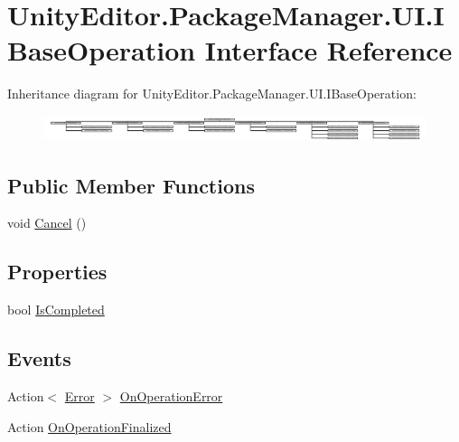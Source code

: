 \hypertarget{interface_unity_editor_1_1_package_manager_1_1_u_i_1_1_i_base_operation}{}\section{Unity\+Editor.\+Package\+Manager.\+U\+I.\+I\+Base\+Operation Interface Reference}
\label{interface_unity_editor_1_1_package_manager_1_1_u_i_1_1_i_base_operation}
Inheritance diagram for Unity\+Editor.\+Package\+Manager.\+U\+I.\+I\+Base\+Operation\+:\begin{figure}[H]
\begin{center}
\leavevmode
\includegraphics[height=0.758808cm]{interface_unity_editor_1_1_package_manager_1_1_u_i_1_1_i_base_operation}
\end{center}
\end{figure}
\subsection*{Public Member Functions}
\begin{DoxyCompactItemize}
\item 
void \mbox{\hyperlink{interface_unity_editor_1_1_package_manager_1_1_u_i_1_1_i_base_operation_ab924259fe1ff324c238ae37c96c42c1e}{Cancel}} ()
\end{DoxyCompactItemize}
\subsection*{Properties}
\begin{DoxyCompactItemize}
\item 
bool \mbox{\hyperlink{interface_unity_editor_1_1_package_manager_1_1_u_i_1_1_i_base_operation_afd5cd3a0d72355105f5ba5e6ad373d1a}{Is\+Completed}}
\end{DoxyCompactItemize}
\subsection*{Events}
\begin{DoxyCompactItemize}
\item 
Action$<$ \mbox{\hyperlink{namespace_unity_editor_1_1_package_manager_1_1_u_i_ab1815eb3e48074893d9dc1dc99a4a32aa902b0d55fddef6f8d651fe1035b7d4bd}{Error}} $>$ \mbox{\hyperlink{interface_unity_editor_1_1_package_manager_1_1_u_i_1_1_i_base_operation_a59bdb665b62e88e5fbbcd0d6e0c9d840}{On\+Operation\+Error}}
\item 
Action \mbox{\hyperlink{interface_unity_editor_1_1_package_manager_1_1_u_i_1_1_i_base_operation_a06c7f83f9ae4c86c58022b867d670e60}{On\+Operation\+Finalized}}
\end{DoxyCompactItemize}


